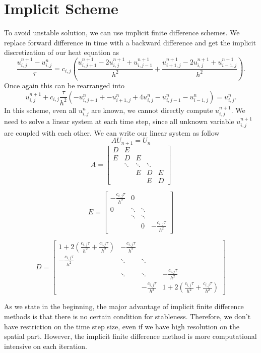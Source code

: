 \documentclass[10pt,a4paper]{report}
\begin{document}
\section{Implicit Scheme}
To avoid unstable solution, we can use implicit finite difference schemes. We replace forward difference in time with a backward difference and get the implicit discretization of our heat equation as \[{\frac{u^{n+1}_{i,j}-u^n_{i,j}}{\tau}}=c_{i,j}({\frac{u^{n+1}_{i,j+1}-2u^{n+1}_{i,j}+u^{n+1}_{i,j-1}}{h^2}}+{\frac{u^{n+1}_{i+1,j}-2u^{n+1}_{i,j}+u^{n+1}_{i-1,j}}{h^2}}).\]
Once again this can be rearranged into
\[u^{n+1}_{i,j}+c_{i,j}{\frac{\tau}{h^2}}(-u^n_{i,j+1}+-u^n_{i+1,j}+4u^n_{i,j}-u^n_{i,j-1}-u^n_{i-1,j})=u^{n}_{i,j}.\]
In this scheme, even all $u^n_{i,j}$ are known, we cannot directly compute $u^{n+1}_{i,j} $. We need to solve a linear system at each time step, since all unknown variable $u^{n+1}_{i,j}$ are coupled with each other. We can write our linear system as follow \[AU_{n+1}=U_{n}\] 
\[A=\begin{bmatrix}
D & E &   &   &   \\
E & D & E &   &   \\
  & \ddots & \ddots &\ddots & \\
  &   & E & D & E \\
  &   &   & E & D    
\end{bmatrix}
\]

\[E=\begin{bmatrix}
-{\frac{c_{i,j}\tau}{h^2}} & 0 & & \\
0 & \ddots & \ddots & \\
  & \ddots & \ddots & \\
  &        & 0 & -{\frac{c_{i,j}\tau}{h^2}}  
\end{bmatrix}
\]

\[D=\begin{bmatrix}
1+2({\frac{c_{i,j}\tau}{h^2}}+{\frac{c_{i,j}\tau}{h^2}}) & -{\frac{c_{i,j}\tau}{h^2}} & &  \\
-{\frac{c_{i,j}\tau}{h^2}} & \ddots & \ddots & \\
& \ddots & \ddots & -{\frac{c_{i,j}\tau}{h^2}}\\
 &  & -{\frac{c_{i,j}\tau}{h^2}} & 1+2({\frac{c_{i,j}\tau}{h^2}}+{\frac{c_{i,j}\tau}{h^2}})
\end{bmatrix}
\]





As we state in the beginning, the major advantage of implicit finite difference methods is that there is no certain condition for stableness. Therefore, we don't have restriction on the time step size, even if we have high resolution on the spatial part. However, the implicit finite difference method is more computational intensive on each iteration. 
\end{document}
